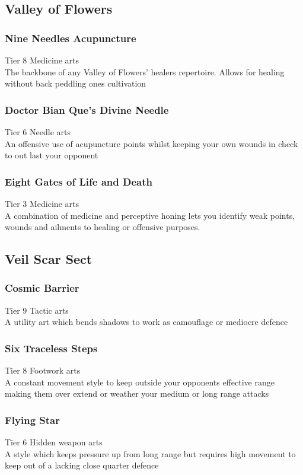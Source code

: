 \subsection{Valley of Flowers}
\subsubsection{Nine Needles Acupuncture}
Tier 8 Medicine arts\\
The backbone of any Valley of Flowers’ healers repertoire. Allows for healing without back peddling ones cultivation

\subsubsection{Doctor Bian Que's Divine Needle}
Tier 6 Needle arts\\
An offensive use of acupuncture points whilst keeping your own wounds in check to out last your opponent

\subsubsection{Eight Gates of Life and Death}
Tier 3 Medicine arts\\
A combination of medicine and perceptive honing lets you identify weak points, wounds and ailments to healing or offensive purposes.

\subsection{Veil Scar Sect}
\subsubsection{Cosmic Barrier}
Tier 9 Tactic arts\\
A utility art which bends shadows to work as camouflage or mediocre defence

\subsubsection{Six Traceless Steps}
Tier 8 Footwork arts\\
A constant movement style to keep outside your opponents effective range making them over extend or weather your medium or long range attacks

\subsubsection{Flying Star}
Tier 6 Hidden weapon arts\\
A style which keeps pressure up from long range but requires high movement to keep out of a lacking close quarter defence

